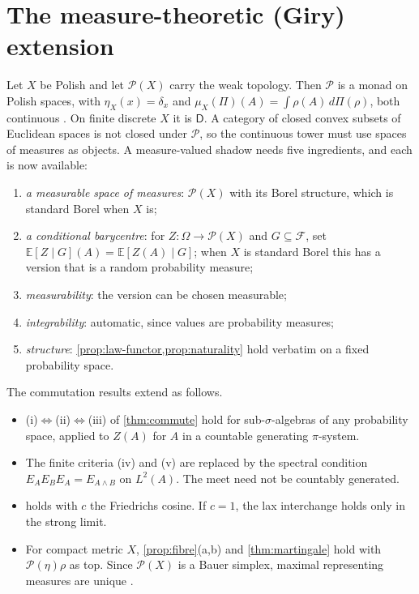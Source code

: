 \documentclass[11pt]{article}
\theoremstyle{definition}
\newcommand{\D}{\mathsf D}
\newcommand{\EE}{\mathbb E}
\begin{document}
\section{The measure-theoretic (Giry) extension}\label{sec:giry}
Let $X$ be Polish and let $\mathcal P(X)$ carry the weak topology. Then $\mathcal P$ is a monad on Polish spaces, with
$\eta_X(x)=\delta_x$ and $\mu_X(\Pi)(A)=\int\rho(A)\,d\Pi(\rho)$, both continuous \cite{Giry1982}. On finite discrete $X$ it is $\D$. A
category of closed convex subsets of Euclidean spaces is not closed under $\mathcal P$, so the continuous tower must use spaces of
measures as objects. A measure-valued shadow needs five ingredients, and each is now available:
\begin{enumerate}[label=(\roman*)]
\item \emph{a measurable space of measures}: $\mathcal P(X)$ with its Borel structure, which is standard Borel when $X$ is;
\item \emph{a conditional barycentre}: for $Z\colon\Omega\to\mathcal P(X)$ and $G\subseteq\mathcal F$, set
  $\EE[Z\mid G](A)=\EE[Z(A)\mid G]$; when $X$ is standard Borel this has a version that is a random probability measure;
\item \emph{measurability}: the version can be chosen measurable;
\item \emph{integrability}: automatic, since values are probability measures;
\item \emph{structure}: \cref{prop:law-functor,prop:naturality} hold verbatim on a fixed probability space.
\end{enumerate}
The commutation results extend as follows.
\begin{itemize}
\item (i)$\Leftrightarrow$(ii)$\Leftrightarrow$(iii) of \cref{thm:commute} hold for sub-$\sigma$-algebras of any probability space,
  applied to $Z(A)$ for $A$ in a countable generating $\pi$-system.
\item The finite criteria (iv) and (v) are replaced by the spectral condition $E_AE_BE_A=E_{A\wedge B}$ on $L^2(A)$. The meet need not
  be countably generated.
\item {} holds with $c$ the Friedrichs cosine. If $c=1$, the lax interchange holds only in the strong limit.
\item For compact metric $X$, \cref{prop:fibre}(a,b) and \cref{thm:martingale} hold with $\mathcal P(\eta)\rho$ as top. Since
  $\mathcal P(X)$ is a Bauer simplex, maximal representing measures are unique \cite{Phelps2001}.
\end{itemize}
\end{document}
